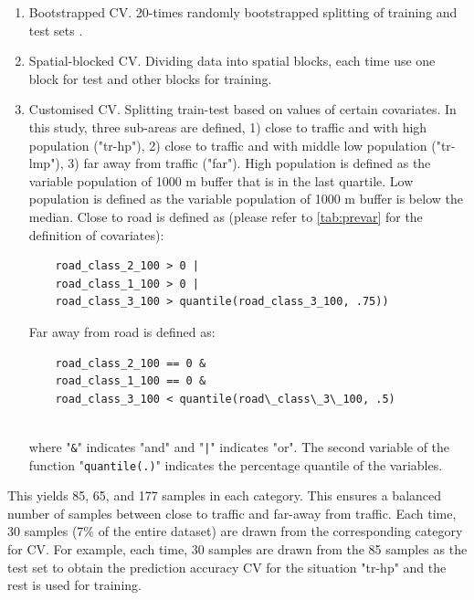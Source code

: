 \documentclass{article}
\begin{document}
\begin{enumerate}
\item Bootstrapped CV. 20-times randomly bootstrapped splitting of training and test sets \citep{luglobal}.  

\item Spatial-blocked CV. Dividing data into spatial blocks, each time use one block for test and other blocks for training. 
    
\item Customised CV. Splitting train-test based on values of certain covariates. In this study, three sub-areas are defined, 1) close to traffic and with high population ("tr-hp"), 2) close to traffic and with middle low population ("tr-lmp"), 3) far away from traffic ("far"). High population is defined as the variable population of 1000 m buffer that is in the last quartile. Low population is defined as the variable population of 1000 m buffer is below the median. Close to road is defined as (please refer to \cref{tab:prevar} for the definition of covariates): 
    \begin{lstlisting} 
    road_class_2_100 > 0 | 
    road_class_1_100 > 0 |
    road_class_3_100 > quantile(road_class_3_100, .75)) \end{lstlisting}
   
    Far away from road is defined as:
  \begin{lstlisting} 
    road_class_2_100 == 0 &
    road_class_1_100 == 0 & 
    road_class_3_100 < quantile(road\_class\_3\_100, .5)
    
    \end{lstlisting}
    where "{\tt \&}" indicates "and" and "{\tt |}" indicates "or". The second variable of the function "{\tt quantile(.)}" indicates the percentage quantile of the variables. 
   
\end{enumerate}
This yields 85, 65, and 177 samples in each category. This ensures a balanced number of samples between close to traffic and far-away from traffic. Each time, 30 samples (7\% of the entire dataset) are drawn from the corresponding category for CV. For example, each time, 30 samples are drawn from the 85 samples as the test set to obtain the prediction accuracy CV for the situation "tr-hp" and the rest is used for training.  
\end{document}
